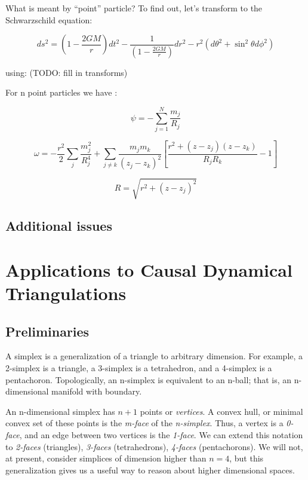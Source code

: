 \documentclass{article}
\begin{document}
What is meant by ``point'' particle? To find out, let's transform
to the Schwarzschild equation:

\begin{equation}
ds^{2}=\left(1-\frac{2GM}{r}\right)dt^{2}-\frac{1}{\left(1-\frac{2GM}{r}\right)}dr^{2}-r^{2}\left(d\theta^{2}+\sin^{2}\theta d\phi^{2}\right)
\end{equation}


using: (TODO: fill in transforms)

For n point particles we have \cite{letelier1997superposition}:

\begin{equation}
\psi=-\sum_{j=1}^{N}\frac{m_{j}}{R_{j}}
\end{equation}


\begin{equation}
\omega=-\frac{r^{2}}{2}\sum_{j}\frac{m_{j}^{2}}{R_{j}^{4}}+\sum_{j\neq k}\frac{m_{j}m_{k}}{\left(z_{j}-z_{k}\right)^{2}}\left[\frac{r^{2}+\left(z-z_{j}\right)\left(z-z_{k}\right)}{R_{j}R_{k}}-1\right]
\end{equation}


\begin{equation}
R=\sqrt{r^{2}+\left(z-z_{j}\right)^{2}}
\end{equation}

\subsection{Additional issues}



\section{Applications to Causal Dynamical Triangulations}

\subsection{Preliminaries}

A simplex is a generalization of a triangle to arbitrary dimension. For example, a 2-simplex is a triangle, a 3-simplex is a tetrahedron, and a 4-simplex is a pentachoron. Topologically, an n-simplex is equivalent to an n-ball; that is, an n-dimensional manifold with boundary.

An n-dimensional simplex has $n+1$ points or \emph{vertices}. A convex hull, or minimal convex set of these points is the \emph{m-face} of the \emph{n-simplex}. Thus, a vertex is a \emph{0-face}, and an edge between two vertices is the \emph{1-face}. We can extend this notation to \emph{2-faces} (triangles), \emph{3-faces} (tetrahedrons), \emph{4-faces} (pentachorons). We will not, at present, consider simplices of dimension higher than $n=4$, but this generalization gives us a useful way to reason about higher dimensional spaces.
\end{document}

